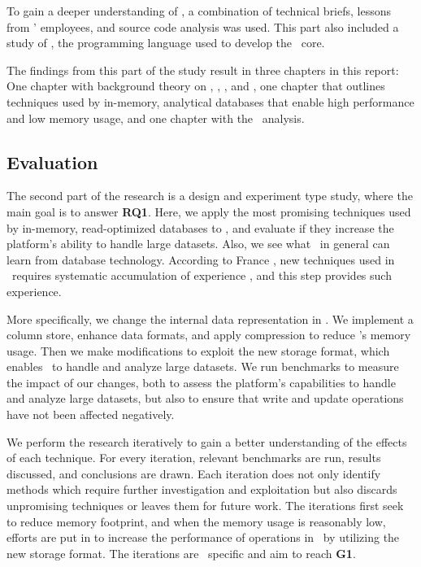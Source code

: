 To gain a deeper understanding of \gap, a combination of technical briefs, lessons from \genus' employees, and source code analysis was used.  This part also included a study of \delphi, the programming language used to develop the \gap~core.

The findings from this part of the study result in three chapters in this report: One chapter with background theory on \mde, \bi, \bd, and \delphi, one chapter that outlines techniques used by in-memory, analytical databases that enable high performance and low memory usage, and one chapter with the \gap~analysis.

\subsection{Evaluation}
\label{sub:Design and Experiment}
The second part of the research is a design and experiment type study, where the main goal is to answer \textbf{RQ1}. Here, we apply the most promising techniques used by in-memory, read-optimized databases to \gap, and evaluate if they increase the platform's ability to handle large datasets. Also, we see what \mde~in general can learn from database technology. According to France \ea, new techniques used in \mde~requires systematic accumulation of experience \cite{France2007-ae}, and this step provides such experience.

More specifically, we change the internal data representation in \gap. We implement a column store, enhance data formats, and apply compression to reduce \gap's memory usage. Then we make modifications to exploit the new storage format, which enables \gap~to handle and analyze large datasets. We run benchmarks to measure the impact of our changes, both to assess the platform's capabilities to handle and analyze large datasets, but also to ensure that write and update operations have not been affected negatively.

We perform the research iteratively to gain a better understanding of the effects of each technique. For every iteration, relevant benchmarks are run, results discussed, and conclusions are drawn. Each iteration does not only identify methods which require further investigation and exploitation but also discards unpromising techniques or leaves them for future work. The iterations first seek to reduce memory footprint, and when the memory usage is reasonably low, efforts are put in to increase the performance of operations in \gap~by utilizing the new storage format. The iterations are \gap~specific and aim to reach \textbf{G1}. 

